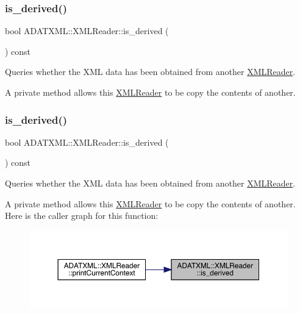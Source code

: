 \subsubsection{\texorpdfstring{is\_derived()}{is\_derived()}\hspace{0.1cm}{\footnotesize\ttfamily [1/3]}}
{\footnotesize\ttfamily bool A\+D\+A\+T\+X\+M\+L\+::\+X\+M\+L\+Reader\+::is\+\_\+derived (\begin{DoxyParamCaption}{ }\end{DoxyParamCaption}) const}



Queries whether the X\+ML data has been obtained from another \mbox{\hyperlink{classADATXML_1_1XMLReader}{X\+M\+L\+Reader}}. 

A private method allows this \mbox{\hyperlink{classADATXML_1_1XMLReader}{X\+M\+L\+Reader}} to be copy the contents of another. \mbox{\label{classADATXML_1_1XMLReader_a64fb149ae8809f993a7750aa5fe1f4b7}} 
\subsubsection{\texorpdfstring{is\_derived()}{is\_derived()}\hspace{0.1cm}{\footnotesize\ttfamily [2/3]}}
{\footnotesize\ttfamily bool A\+D\+A\+T\+X\+M\+L\+::\+X\+M\+L\+Reader\+::is\+\_\+derived (\begin{DoxyParamCaption}{ }\end{DoxyParamCaption}) const}



Queries whether the X\+ML data has been obtained from another \mbox{\hyperlink{classADATXML_1_1XMLReader}{X\+M\+L\+Reader}}. 

A private method allows this \mbox{\hyperlink{classADATXML_1_1XMLReader}{X\+M\+L\+Reader}} to be copy the contents of another. Here is the caller graph for this function\+:
\nopagebreak
\begin{figure}[H]
\begin{center}
\leavevmode
\includegraphics[width=350pt]{db/d3f/classADATXML_1_1XMLReader_a64fb149ae8809f993a7750aa5fe1f4b7_icgraph}
\end{center}
\end{figure}
\mbox{\label{classADATXML_1_1XMLReader_a64fb149ae8809f993a7750aa5fe1f4b7}} 
